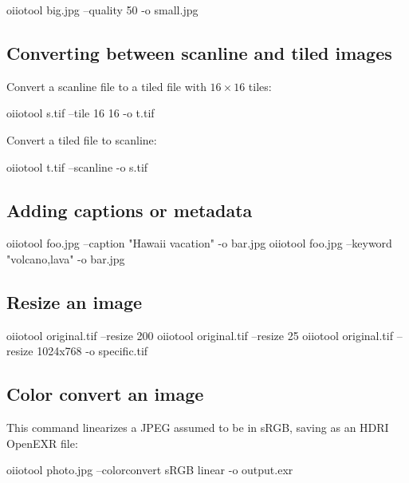 \begin{code}
    oiiotool big.jpg --quality 50 -o small.jpg
\end{code}



\subsection*{Converting between scanline and tiled images}

Convert a scanline file to a tiled file with $16 \times 16$ tiles:

\begin{code}
    oiiotool s.tif --tile 16 16 -o t.tif
\end{code}

\noindent Convert a tiled file to scanline:

\begin{code}
    oiiotool t.tif --scanline -o s.tif
\end{code}



\subsection*{Adding captions or metadata}

\begin{code}
    oiiotool foo.jpg --caption "Hawaii vacation" -o bar.jpg
    oiiotool foo.jpg --keyword "volcano,lava" -o bar.jpg
\end{code}


\subsection*{Resize an image}

\begin{code}
    oiiotool original.tif --resize 200%
    oiiotool original.tif --resize 25%
    oiiotool original.tif --resize 1024x768 -o specific.tif
\end{code}


\subsection*{Color convert an image}

This command linearizes a JPEG assumed to be in sRGB, saving as
an HDRI OpenEXR file:

\begin{code}
    oiiotool photo.jpg --colorconvert sRGB linear -o output.exr
\end{code}

